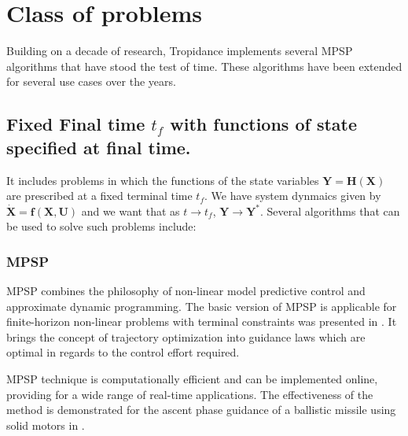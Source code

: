 \documentclass[12pt]{article}
\let\oldref\ref
\renewcommand{\ref}[1]{(\oldref{#1})}
\renewcommand{\vec}[1]{\mathbf{#1}}
\begin{document}
\section{Class of problems}

Building on a decade of research, Tropidance implements several MPSP algorithms that have stood the test of time. These algorithms have been extended for several use cases over the years.

\subsection{Fixed Final time $t_f$ with functions of state specified at final time.}

It includes problems in which the functions of the state variables $ \vec{Y} = \vec{H}(\vec{X})$ are prescribed at a fixed terminal time $t_f$. We have system dynmaics given by $\vec{\dot{X}} = \vec{f(X,U)}$ and we want that as $t \rightarrow t_f $, $\vec{Y} \rightarrow \vec{Y^*}$. Several algorithms that can be used to solve such problems include:




\subsubsection*{MPSP}
MPSP combines the philosophy of non-linear model predictive control and approximate dynamic programming. The basic version of MPSP is applicable for finite-horizon non-linear problems with terminal constraints was presented in \cite{padhi2009model}. It brings the concept of trajectory optimization into guidance laws which are optimal in regards to the control effort required.

MPSP technique is computationally efficient and can be implemented online, providing for a wide range of real-time applications.  The effectiveness of the method is demonstrated for the ascent phase guidance of a ballistic missile using solid motors in \cite{padhi2009model}.
\end{document}
